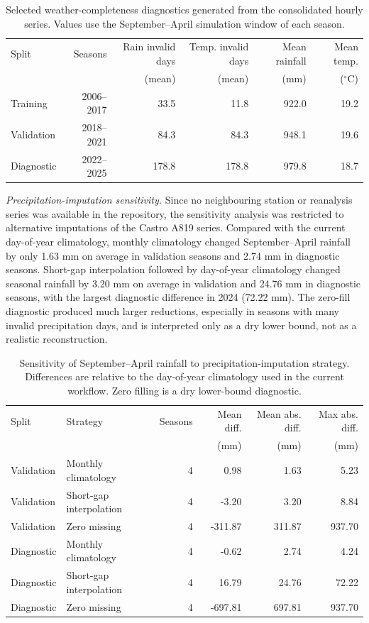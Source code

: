 \documentclass[times,final,authoryear]{elsarticle}
\begin{document}
\begin{table}[!h]
\centering
\scriptsize
\caption{Selected weather-completeness diagnostics generated from the consolidated hourly series. Values use the September--April simulation window of each season.}
\label{tab_weather_completeness_diag}
\begin{tabular}{lrrrrr}
\hline
Split & Seasons & Rain invalid days & Temp. invalid days & Mean rainfall & Mean temp. \\
      &         & (mean) & (mean) & (mm) & ($^\circ$C) \\
\hline
Training & 2006--2017 & 33.5 & 11.8 & 922.0 & 19.2 \\
Validation & 2018--2021 & 84.3 & 84.3 & 948.1 & 19.6 \\
Diagnostic & 2022--2025 & 178.8 & 178.8 & 979.8 & 18.7 \\
\hline
\end{tabular}
\end{table}

\emph{Precipitation-imputation sensitivity.} Since no neighbouring station or reanalysis series was available in the repository, the sensitivity analysis was restricted to alternative imputations of the Castro A819 series. Compared with the current day-of-year climatology, monthly climatology changed September--April rainfall by only 1.63 mm on average in validation seasons and 2.74 mm in diagnostic seasons. Short-gap interpolation followed by day-of-year climatology changed seasonal rainfall by 3.20 mm on average in validation and 24.76 mm in diagnostic seasons, with the largest diagnostic difference in 2024 (72.22 mm). The zero-fill diagnostic produced much larger reductions, especially in seasons with many invalid precipitation days, and is interpreted only as a dry lower bound, not as a realistic reconstruction.

\begin{table}[!h]
\centering
\scriptsize
\caption{Sensitivity of September--April rainfall to precipitation-imputation strategy. Differences are relative to the day-of-year climatology used in the current workflow. Zero filling is a dry lower-bound diagnostic.}
\label{tab_weather_imputation_sensitivity}
\begin{tabular}{llrrrr}
\hline
Split & Strategy & Seasons & Mean diff. & Mean abs. diff. & Max abs. diff. \\
      &          &         & (mm)       & (mm)            & (mm) \\
\hline
Validation & Monthly climatology & 4 & 0.98 & 1.63 & 5.23 \\
Validation & Short-gap interpolation & 4 & -3.20 & 3.20 & 8.84 \\
Validation & Zero missing & 4 & -311.87 & 311.87 & 937.70 \\
Diagnostic & Monthly climatology & 4 & -0.62 & 2.74 & 4.24 \\
Diagnostic & Short-gap interpolation & 4 & 16.79 & 24.76 & 72.22 \\
Diagnostic & Zero missing & 4 & -697.81 & 697.81 & 937.70 \\
\hline
\end{tabular}
\end{table}
\end{document}
